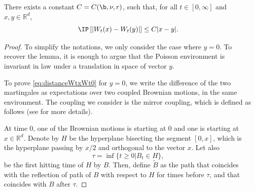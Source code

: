 \begin{lemma} \label{lm:distanceWtxWt0}
There exists a constant $C=C(\b,\nu,r)$, such that, for all $t\in [0,\infty]$ and $x,y\in\mathbb{R}^d$,
\begin{equation} \label{eq:distanceWtxWt0}
\IP\left[\left|W_t(x)-W_t(y)\right|\right] \leq C |x-y|.
\end{equation}
\end{lemma}
\begin{proof} To simplify the notations, we only consider the case where $y=0$. To recover the lemma, it is enough to argue that the Poisson environment is invariant in law under a translation in space of vector $y$.

To prove \eqref{eq:distanceWtxWt0} for $y=0$, we write the difference of the two martingales as expectations over two coupled Brownian motions, in the same environment.
The coupling we consider is the mirror coupling, which is defined as follows (see \cite{Hsu2013} for more details).

At time $0$, one of the Brownian motions is starting at $0$ and one is starting at $x \in \mathbb{R}^d$. Denote by $H$ be the hyperplane bisecting the segment $[0,x]$, which is the hyperplane passing by $x/2$ and orthogonal to the vector $x$. Let also
\[\tau = \inf\{t\geq 0 | B_t \in H\},\]
be the first hitting time of $H$ by $B$. Then, define $\widetilde{B}$ as the path that coincides with the reflection of path of $B$ with respect to $H$ for times before $\tau$, and that coincides with $B$ after $\tau$. 


\end{proof}
